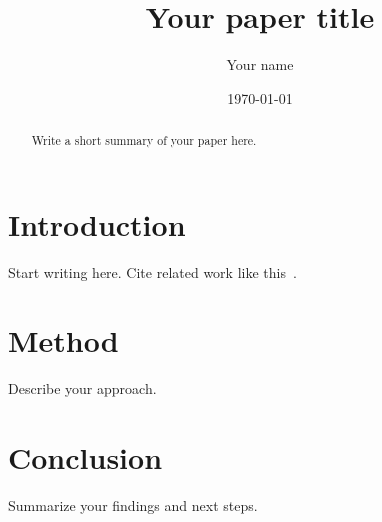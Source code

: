 \documentclass[11pt]{article}
\title{Your paper title}
\author{Your name}
\date{\today}
\begin{document}
\maketitle

\begin{abstract}
Write a short summary of your paper here.
\end{abstract}

\section{Introduction}
Start writing here. Cite related work like this~\cite{knuth1984}.

\section{Method}
Describe your approach.

\section{Conclusion}
Summarize your findings and next steps.



\end{document}
